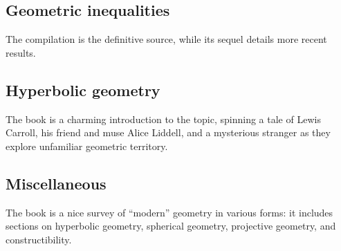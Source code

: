 \documentclass[12pt]{book}
\numberwithin{exc}{section}
\numberwithin{figure}{section}
\numberwithin{equation}{theorem}
\begin{document}
\subsection*{Geometric inequalities}
The compilation \cite{bib:bott} is the definitive
source, while its sequel \cite{bib:rcige} details more recent results.

\subsection*{Hyperbolic geometry}
The book \cite{bib:sve} is a charming introduction
to the topic, spinning a tale of Lewis Carroll, his friend and muse Alice
Liddell, and a mysterious stranger as they explore unfamiliar
geometric territory.

\subsection*{Miscellaneous}
The book \cite{bib:baragar} is a nice survey
of ``modern'' geometry in various forms: it includes sections on hyperbolic
geometry, spherical geometry, projective geometry, and constructibility.
\end{document}
